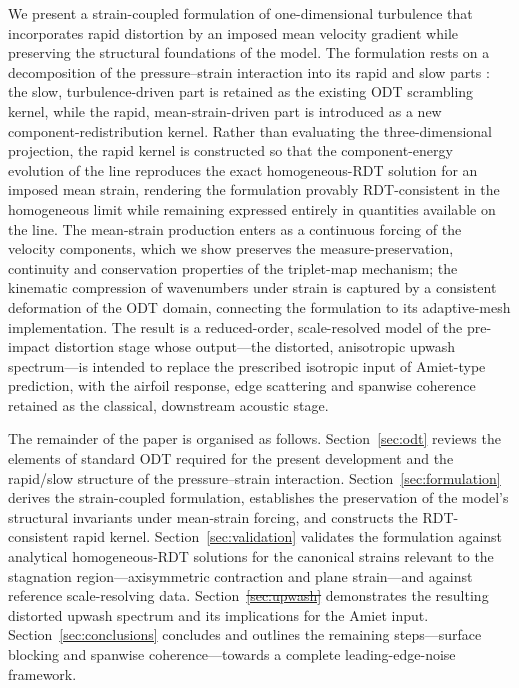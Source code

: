 \documentclass[lineno]{JFM-FLM_Au}
\providecommand{\DIFadd}[1]{{\protect\color{blue}\uwave{#1}}} %
\providecommand{\DIFdel}[1]{{\protect\color{red}\sout{#1}}}                      %
\providecommand{\DIFaddbegin}{} %
\providecommand{\DIFaddend}{} %
\providecommand{\DIFdelbegin}{} %
\providecommand{\DIFdelend}{} %
\begin{document}
We present a strain-coupled formulation of one-dimensional turbulence that
incorporates rapid distortion by an imposed mean velocity gradient while
preserving the structural foundations of the model. The formulation rests
on a decomposition of the pressure--strain interaction into its rapid and
slow parts \citep{Pope2000}: the slow, turbulence-driven part is retained
as the existing ODT scrambling kernel, while the rapid, mean-strain-driven
part is introduced as a new component-redistribution kernel. Rather than
evaluating the three-dimensional projection, the rapid kernel is
constructed so that the component-energy evolution of the line reproduces
the exact homogeneous-RDT solution for an imposed mean strain, rendering
the formulation provably RDT-consistent in the homogeneous limit while
remaining expressed entirely in quantities available on the line. The
mean-strain production enters as a continuous forcing of the velocity
components, which we show preserves the measure-preservation, continuity
and conservation properties of the triplet-map mechanism; the kinematic
compression of wavenumbers under strain is captured by a consistent
deformation of the ODT domain, connecting the formulation to its
adaptive-mesh implementation. The result is a reduced-order, scale-resolved
model of the pre-impact distortion stage whose output---the distorted,
anisotropic upwash spectrum---is intended to replace the prescribed
isotropic input of Amiet-type prediction, with the airfoil response, edge
scattering and spanwise coherence retained as the classical, downstream
acoustic stage.

The remainder of the paper is organised as follows.
Section~\ref{sec:odt} reviews the elements of standard ODT required for the
present development and the rapid/slow structure of the pressure--strain
interaction. Section~\ref{sec:formulation} derives the strain-coupled
formulation, establishes the preservation of the model's structural
invariants under mean-strain forcing, and constructs the RDT-consistent
rapid kernel. Section~\ref{sec:validation} validates the formulation
against analytical homogeneous-RDT solutions for the canonical strains
relevant to the stagnation region---axisymmetric contraction and plane
strain---and against reference scale-resolving data. Section~\DIFdelbegin \DIFdel{\ref{sec:upwash}
}\DIFdelend \DIFaddbegin \DIFadd{\ref{sec:val-spectrum} }\DIFaddend demonstrates the resulting distorted upwash spectrum and its implications for the Amiet input. Section~\ref{sec:conclusions} concludes and outlines
the remaining steps---surface blocking and spanwise coherence---towards a
complete leading-edge-noise framework.
\end{document}
